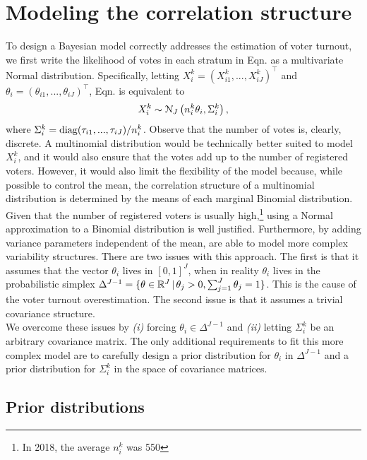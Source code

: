 \documentclass{article}
\begin{document}
\section{Modeling the correlation structure}


To design a Bayesian model correctly addresses the estimation of voter turnout, we first write the likelihood of votes in each stratum in Eqn.  as a multivariate Normal distribution. Specifically, letting $X_i^k = (X_{i1}^k,..., X_{iJ}^k)^\top$ and $\theta_i = (\theta_{i1}, ..., \theta_{iJ})^\top$, Eqn.  is equivalent to
\[
  X_i^k \sim \mathcal{N}_J \left( n_i^k \theta_i, \Sigma_i^k \right),
\]
where $\Sigma_i^k = \operatorname{diag}(\tau_{i1}, ..., \tau_{iJ}) / n_i^k$. Observe that the number of votes is, clearly, discrete. A multinomial distribution would be technically better suited to model $X_i^k$, and it would also ensure that the votes add up to the number of registered voters. However, it would also limit the flexibility of the model because, while possible to control the mean, the correlation structure of a multinomial distribution is determined by the means of each marginal Binomial distribution.
\\


Given that the number of registered voters is usually high,\footnote{In 2018, the average $n_i^k$ was 550} using a Normal approximation to a Binomial distribution is well justified. Furthermore, by adding variance parameters independent of the mean, \citet{mendoza-nieto2016, diluvi2018} are able to model more complex variability structures. There are two issues with this approach. The first is that it assumes that the vector $\theta_i$ lives in $[0, 1]^J$, when in reality $\theta_i$ lives in the probabilistic simplex $\Delta^{J-1} = \{ \theta \in \mathbb{R}^J \,|\, \theta_j > 0, \sum_{j=1}^J \theta_j = 1 \}$. This is the cause of the voter turnout overestimation. The second issue is that it assumes a trivial covariance structure.
\\


We overcome these issues by \textit{(i)} forcing $\theta_i \in \Delta^{J-1}$ and \textit{(ii)} letting $\Sigma_i^k$ be an arbitrary covariance matrix. The only additional requirements to fit this more complex model are to carefully design a prior distribution for $\theta_i$ in $\Delta^{J-1}$ and a prior distribution for $\Sigma_i^k$ in the space of covariance matrices.


\subsection{Prior distributions}
\end{document}
